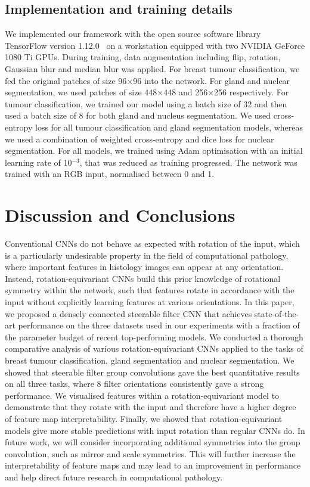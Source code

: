 \documentclass[journal]{IEEEtran}
\begin{document}
	    
	\subsection{Implementation and training details} \label{section:implementation}
	We implemented our framework with the open source software library TensorFlow version 1.12.0~\cite{abadi2016tensorflow} on a workstation equipped with two NVIDIA GeForce 1080 Ti GPUs. During training, data augmentation including flip, rotation, Gaussian blur and median blur was applied. For breast tumour classification, we fed the original patches of size 96$\times$96 into the network. For gland and nuclear segmentation, we used patches of size 448$\times$448 and 256$\times$256 respectively. For tumour classification, we trained our model using a batch size of 32 and then used a batch size of 8 for both gland and nucleus segmentation. We used cross-entropy loss for all tumour classification and gland segmentation models, whereas we used a combination of weighted cross-entropy and dice loss for nuclear segmentation. For all models, we trained using Adam optimisation with an initial learning rate of 10$^{-3}$, that was reduced as training progressed. The network was trained with an RGB input, normalised between 0 and 1.

	

\section{Discussion and Conclusions}

Conventional CNNs do not behave as expected with rotation of the input, which is a particularly undesirable property in the field of computational pathology, where important features in histology images can appear at any orientation. Instead, rotation-equivariant CNNs build this prior knowledge of rotational symmetry within the network, such that features rotate in accordance with the input without explicitly learning features at various orientations. In this paper, we proposed a densely connected steerable filter CNN that achieves state-of-the-art performance on the three datasets used in our experiments with a fraction of the parameter budget of recent top-performing models. We conducted a thorough comparative analysis of various rotation-equivariant CNNs applied to the tasks of breast tumour classification, gland segmentation and nuclear segmentation. We showed that steerable filter group convolutions gave the best quantitative results on all three tasks, where 8 filter orientations consistently gave a strong performance. We visualised features within a rotation-equivariant model to demonstrate that they rotate with the input and therefore have a higher degree of feature map interpretability. Finally, we showed that rotation-equivariant models give more stable predictions with input rotation than regular CNNs do. In future work, we will consider incorporating additional symmetries into the group convolution, such as mirror and scale symmetries. This will further increase the interpretability of feature maps and may lead to an improvement in performance and help direct future research in computational pathology.
	
\end{document}
